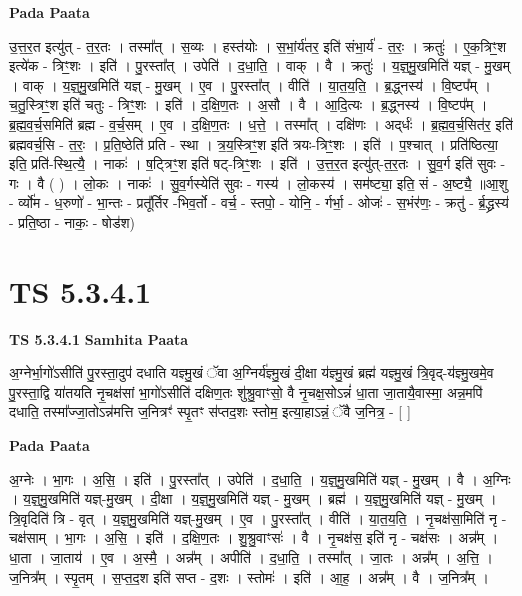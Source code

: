 \documentclass[17pt]{extarticle}
\begin{document}
\textbf{Pada Paata} \newline

उ॒त्त॒र॒त इत्यु॑त् - त॒र॒तः । तस्मा᳚त् । स॒व्यः । हस्त॑योः । स॒भां॒र्य॑तर॒ इति॑ संभा॒र्य॑ - त॒रः॒ । क्रतुः॑ । ए॒क॒त्रिꣳ॒॒श इत्ये॑क - त्रिꣳ॒॒शः । इति॑ । पु॒रस्ता᳚त् । उपेति॑ । द॒धा॒ति॒ । वाक् । वै । क्रतुः॑ । य॒ज्ञ्॒मु॒खमिति॑ यज्ञ् - मु॒खम् । वाक् । य॒ज्ञ्॒मु॒खमिति॑ यज्ञ् - मु॒खम् । ए॒व । पु॒रस्ता᳚त् । वीति॑ । या॒त॒य॒ति॒ । ब्र॒द्ध्नस्य॑ । वि॒ष्टप᳚म् । च॒तु॒स्त्रिꣳ॒॒श इति॑ चतुः - त्रिꣳ॒॒शः । इति॑ । द॒क्षि॒ण॒तः । अ॒सौ । वै । आ॒दि॒त्यः । ब्र॒द्ध्नस्य॑ । वि॒ष्टप᳚म् । ब्र॒ह्म॒व॒र्च॒समिति॑ ब्रह्म - व॒र्च॒सम् । ए॒व । द॒क्षि॒ण॒तः । ध॒त्ते॒ । तस्मा᳚त् । दक्षि॑णः । अद्‌र्धः॑ । ब्र॒ह्म॒व॒र्च॒सित॑र॒ इति॑ ब्रह्मवर्च॒सि - त॒रः॒ । प्र॒ति॒ष्ठेति॑ प्रति - स्था । त्र॒य॒स्त्रिꣳ॒॒श इति॑ त्रयः-त्रिꣳ॒॒शः । इति॑ । प॒श्चात् । प्रति॑ष्ठित्या॒ इति॒ प्रति॑-स्थि॒त्यै॒ । नाकः॑ । ष॒ट्त्रिꣳ॒॒श इति॑ षट्-त्रिꣳ॒॒शः । इति॑ । उ॒त्त॒र॒त इत्यु॑त्-त॒र॒तः । सु॒व॒र्ग इति॑ सुवः - गः । वै ( ) । लो॒कः । नाकः॑ । सु॒व॒र्गस्येति॑ सुवः - गस्य॑ । लो॒कस्य॑ । सम॑ष्ट्या॒ इति॒ सं - अ॒ष्ट्यै॒ ॥आ॒शु - र्व्यो॑म - ध॒रुणो॑ - भा॒न्तः - प्रतू᳚र्तिर -भिव॒र्तो - वर्च॒ - स्तपो॒ - योनि॒ - र्गर्भा॒ - ओजः॑ - स॒भंर॑णः॒ - क्रतु॑ - र्ब्र॒द्ध्रस्य॑ - प्रति॒ष्ठा - नाकः॒ - षोड॑श)  \newline




\section*{ TS 5.3.4.1 }

\textbf{TS 5.3.4.1 } \newline
\textbf{Samhita Paata} \newline

अ॒ग्नेर्भा॒गो॑ऽसीति॑ पु॒रस्ता॒दुप॑ दधाति यज्ञ्मु॒खं ॅवा अ॒ग्निर्य॑ज्ञ्मु॒खं दी॒क्षा य॑ज्ञ्मु॒खं ब्रह्म॑ यज्ञ्मु॒खं त्रि॒वृद्-य॑ज्ञ्मु॒खमे॒व पु॒रस्ता॒द्वि या॑तयति नृ॒चक्ष॑सां भा॒गो॑ऽसीति॑ दक्षिण॒तः शु॑श्रु॒वाꣳसो॒ वै नृ॒चक्ष॒सोऽन्नं॑ धा॒ता जा॒तायै॒वास्मा॒ अन्न॒मपि॑ दधाति॒ तस्मा᳚ज्जा॒तोऽन्न॑मत्ति ज॒नित्रꣳ॑ स्पृ॒तꣳ स॑प्तद॒शः स्तोम॒ इत्या॒हाऽन्नं॒ ॅवै ज॒नित्र॒ - [  ] \newline

\textbf{Pada Paata} \newline

अ॒ग्नेः । भा॒गः । अ॒सि॒ । इति॑ । पु॒रस्ता᳚त् । उपेति॑ । द॒धा॒ति॒ । य॒ज्ञ्॒मु॒खमिति॑ यज्ञ् - मु॒खम् । वै । अ॒ग्निः । य॒ज्ञ्॒मु॒खमिति॑ यज्ञ्-मु॒खम् । दी॒क्षा । य॒ज्ञ्॒मु॒खमिति॑ यज्ञ् - मु॒खम् । ब्रह्म॑ । य॒ज्ञ्॒मु॒खमिति॑ यज्ञ् - मु॒खम् । त्रि॒वृदिति॑ त्रि - वृत् । य॒ज्ञ्॒मु॒खमिति॑ यज्ञ्-मु॒खम् । ए॒व । पु॒रस्ता᳚त् । वीति॑ । या॒त॒य॒ति॒ । नृ॒चक्ष॑सा॒मिति॑ नृ - चक्ष॑साम् । भा॒गः । अ॒सि॒ । इति॑ । द॒क्षि॒ण॒तः । शु॒श्रु॒वाꣳसः॑ । वै । नृ॒चक्ष॑स॒ इति॑ नृ - चक्ष॑सः । अन्न᳚म् । धा॒ता । जा॒ताय॑ । ए॒व । अ॒स्मै॒ । अन्न᳚म् । अपीति॑ । द॒धा॒ति॒ । तस्मा᳚त् । जा॒तः । अन्न᳚म् । अ॒त्ति॒ । ज॒नित्र᳚म् । स्पृ॒तम् । स॒प्त॒द॒श इति॑ सप्त - द॒शः । स्तोमः॑ । इति॑ । आ॒ह॒ । अन्न᳚म् । वै । ज॒नित्र᳚म् ।  \newline
\end{document}
